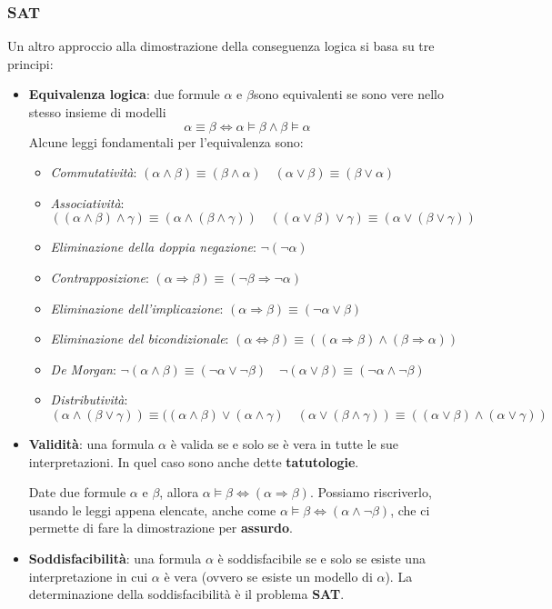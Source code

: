 \subsubsection{SAT}
Un altro approccio alla dimostrazione della conseguenza logica si basa su tre principi:
\begin{itemize}
	\item \textbf{Equivalenza logica}: due formule $\alpha$ e $\beta$sono equivalenti se sono vere nello stesso insieme di modelli
	\begin{equation}
		\alpha \equiv \beta \Leftrightarrow \alpha \models \beta\land\beta\models\alpha
	\end{equation}
	Alcune leggi fondamentali per l'equivalenza sono:
	\begin{itemize}
		\item \textit{Commutatività}: $(\alpha\land\beta)\equiv(\beta\land\alpha)\quad(\alpha\lor\beta)\equiv(\beta\lor\alpha)$
		\item \textit{Associatività}: $((\alpha\land\beta)\land\gamma)\equiv(\alpha\land(\beta\land\gamma))\quad((\alpha\lor\beta)\lor\gamma)\equiv(\alpha\lor(\beta\lor\gamma))$
		\item \textit{Eliminazione della doppia negazione}: $\neg(\neg\alpha)$
		\item \textit{Contrapposizione}: $(\alpha\Rightarrow\beta)\equiv(\neg\beta\Rightarrow\neg\alpha)$
		\item \textit{Eliminazione dell'implicazione}: $(\alpha\Rightarrow\beta)\equiv(\neg\alpha\lor\beta)$
		\item \textit{Eliminazione del bicondizionale}: $(\alpha\Leftrightarrow\beta)\equiv((\alpha\Rightarrow\beta)\land(\beta\Rightarrow\alpha))$
		\item \textit{De Morgan}: $\neg(\alpha \land\beta)\equiv(\neg\alpha\lor\neg\beta)\quad\neg(\alpha \lor\beta)\equiv(\neg\alpha\land\neg\beta)$
		\item \textit{Distributività}: $(\alpha\land(\beta\lor\gamma))\equiv((\alpha\land\beta)\lor(\alpha\land\gamma)\quad(\alpha\lor(\beta\land\gamma))\equiv((\alpha\lor\beta)\land(\alpha\lor\gamma))$
	\end{itemize}
	\item \textbf{Validità}: una formula $\alpha$ è valida se e solo se è vera in tutte le sue interpretazioni. In quel caso sono anche dette \textbf{tatutologie}.
	\begin{theorem}
		Date due formule $\alpha$ e $\beta$, allora $\alpha \models\beta \Leftrightarrow (\alpha\Rightarrow\beta)$. Possiamo riscriverlo, usando le leggi appena elencate, anche come $\alpha\models\beta \Leftrightarrow (\alpha \land \neg\beta)$, che ci permette di fare la dimostrazione per \textbf{assurdo}.
	\end{theorem}
	\item \textbf{Soddisfacibilità}: una formula $\alpha$ è soddisfacibile se e solo se esiste una interpretazione in cui $\alpha$ è vera (ovvero se esiste un modello di $\alpha$). La determinazione della soddisfacibilità è il problema \textbf{SAT}.
\end{itemize}
